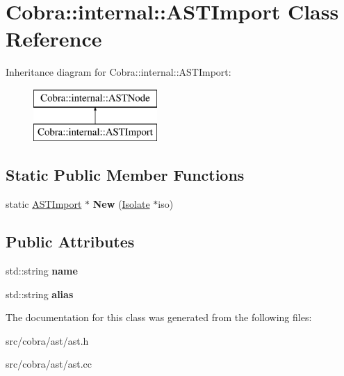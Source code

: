 \hypertarget{class_cobra_1_1internal_1_1_a_s_t_import}{\section{Cobra\+:\+:internal\+:\+:A\+S\+T\+Import Class Reference}
\label{class_cobra_1_1internal_1_1_a_s_t_import}
}
Inheritance diagram for Cobra\+:\+:internal\+:\+:A\+S\+T\+Import\+:\begin{figure}[H]
\begin{center}
\leavevmode
\includegraphics[height=2.000000cm]{class_cobra_1_1internal_1_1_a_s_t_import}
\end{center}
\end{figure}
\subsection*{Static Public Member Functions}
\begin{DoxyCompactItemize}
\item 
\hypertarget{class_cobra_1_1internal_1_1_a_s_t_import_afa9ca85c7e0102cc6dbfb3f61426ae7a}{static \hyperlink{class_cobra_1_1internal_1_1_a_s_t_import}{A\+S\+T\+Import} $\ast$ {\bfseries New} (\hyperlink{class_cobra_1_1internal_1_1_isolate}{Isolate} $\ast$iso)}\label{class_cobra_1_1internal_1_1_a_s_t_import_afa9ca85c7e0102cc6dbfb3f61426ae7a}

\end{DoxyCompactItemize}
\subsection*{Public Attributes}
\begin{DoxyCompactItemize}
\item 
\hypertarget{class_cobra_1_1internal_1_1_a_s_t_import_a69e0166ecf3c002a600cbeb1aaa71203}{std\+::string {\bfseries name}}\label{class_cobra_1_1internal_1_1_a_s_t_import_a69e0166ecf3c002a600cbeb1aaa71203}

\item 
\hypertarget{class_cobra_1_1internal_1_1_a_s_t_import_a813737b31c56fe6aed198af56605c2ce}{std\+::string {\bfseries alias}}\label{class_cobra_1_1internal_1_1_a_s_t_import_a813737b31c56fe6aed198af56605c2ce}

\end{DoxyCompactItemize}


The documentation for this class was generated from the following files\+:\begin{DoxyCompactItemize}
\item 
src/cobra/ast/ast.\+h\item 
src/cobra/ast/ast.\+cc\end{DoxyCompactItemize}

